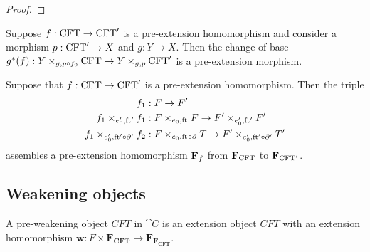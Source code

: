 \begin{proof}
\begin{comment}
Our next subgoal is to verify that the square
\begin{equation*}
\begin{tikzcd}
\pullback%
  {\pullback{Y}{\stesysf}{g}{p\circ\eft}}%
  {\pullback{Y}{\stesysf}{g}{p\circ\eft}}%
  {g^\ast(\ectxext)}%
  {g^\ast(\eft)}
  \ar{r}{g^\ast(\efamext)} 
  \ar{d}[swap]{(g^\ast(\ectxext))^\ast(g^\ast(\ectxext))} 
  & 
\pullback{Y}{\stesysf}{g}{p\circ\eft}
  \ar{d}{g^\ast(\ectxext)}
  \\
\pullback{Y}{\stesysf}{g}{p\circ\eft}
  \ar{r}[swap]{g^\ast(\ectxext)} 
  & 
\pullback{Y}{\stesysc}{g}{p}
\end{tikzcd}
\end{equation*}
\end{comment}
\end{proof}

\begin{lem}
Suppose $f:\mathrm{CFT}\to \mathrm{CFT}'$ is a pre-extension homomorphism and consider a morphism
$p:\mathrm{CFT}'\to X$ and $g:Y\to X$. Then the change of base 
$g^\ast(f):\cobesys{Y}{\stesys}{g}{p\circ f_0}\to
\cobesys{Y}{\stesys'}{g}{p}$ is a pre-extension morphism.
\end{lem}

\begin{lem}
Suppose that $f:\mathrm{CFT}\to\mathrm{CFT}'$ is a pre-extension homomorphism. Then the
triple
\begin{align*}
f_1 & : \stesysf\to\stesysf'
  \\
\pullback{f_1}{f_1}{\ectxext'}{\eft'}
  & : \pullback{\stesysf}{\stesysf}{\ectxext}{\eft}
  \to \pullback{\stesysf'}{\stesysf'}{\ectxext'}{\eft'}
  \\
\pullback{f_1}{f_2}{\ectxext'}{\eft'\circ\ebd'}
  & : \pullback{\stesysf}{\stesyst}{\ectxext}{\eft\circ\ebd}
  \to \pullback{\stesysf'}{\stesyst'}{\ectxext'}{\eft'\circ\ebd'}
\end{align*}
assembles a pre-extension homomorphism $\mathbf{F}_{f}$ from
$\mathbf{F}_{\mathrm{CFT}}$ to $\mathbf{F}_{\mathrm{CFT}'}$.
\end{lem}

\subsection{Weakening objects}
\begin{defn}
A pre-weakening object $CFT$ in $\cat{C}$ is an extension object $CFT$ with 
an extension homomorphism $\mathbf{w}:F\times\mathbf{F_{CFT}}\to \mathbf{F_{F_{CFT}}}$.
\end{defn}

